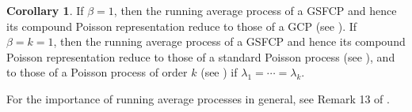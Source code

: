 \documentclass[11pt,oneside,reqno]{amsart}
\theoremstyle{definition}
\newtheorem{remark}{\bf Remark}[section]
\newtheorem{corollary}{Corollary}[section]
\theoremstyle{remarkstyle}
\begin{document}

\begin{corollary}
If $\beta=1$, then the running average process of a GSFCP and hence its compound Poisson representation  reduce to those of a GCP (see \citet{Tathe2024}). If $\beta=k=1$, then the running average process of a GSFCP and hence its compound Poisson representation reduce to those of a standard Poisson process (see \citet{Xia2018}), and to those of a Poisson process of order $k$ (see \citet{Gupta2020}) if $\lambda_1=\cdots=\lambda_k$. 
\end{corollary}
For the importance of running average processes in general, see Remark 13 of \citet{Tathe2024}.
\end{document}
